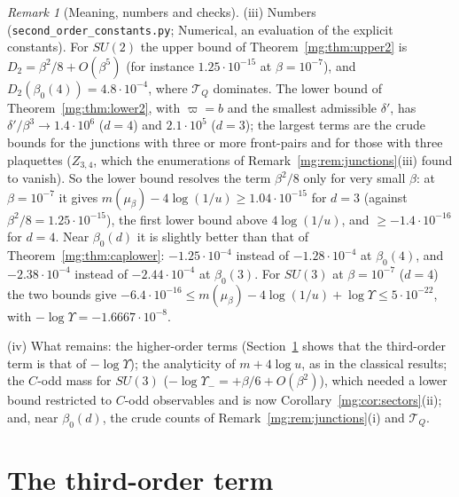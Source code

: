 \documentclass[11pt,a4paper]{article}
\theoremstyle{definition}
\theoremstyle{remark}
\newtheorem{remark}[theorem]{Remark}
\begin{document}
\begin{remark}[Meaning, numbers and checks]
(iii) Numbers (\texttt{second\_order\_constants.py}; Numerical, an evaluation of the explicit constants). For $SU(2)$ the upper bound of
Theorem~\ref{mg:thm:upper2} is $D_2=\beta^2/8+O(\beta^5)$ (for instance $1.25\cdot10^{-15}$ at $\beta=10^{-7}$), and $D_2(\beta_0(4))=4.8\cdot10^{-4}$, where
$\mathcal T_Q$ dominates. The lower bound of Theorem~\ref{mg:thm:lower2}, with $\varpi=b$ and the smallest admissible $\delta'$, has $\delta'/\beta^3\to1.4\cdot10^6$ ($d=4$)
and $2.1\cdot10^5$ ($d=3$); the largest terms are the crude bounds for the junctions with three or more front-pairs and for those with three plaquettes
($Z_{3,4}$, which the enumerations of Remark~\ref{mg:rem:junctions}(iii) found to vanish). So the lower bound resolves the term $\beta^2/8$ only for very small
$\beta$: at $\beta=10^{-7}$ it gives $m(\mu_\beta)-4\log(1/u)\ge1.04\cdot10^{-15}$ for $d=3$ (against $\beta^2/8=1.25\cdot10^{-15}$), the first lower bound
above $4\log(1/u)$, and $\ge-1.4\cdot10^{-16}$ for $d=4$. Near $\beta_0(d)$ it is slightly better than that of Theorem~\ref{mg:thm:caplower}:
$-1.25\cdot10^{-4}$ instead of $-1.28\cdot10^{-4}$ at $\beta_0(4)$, and $-2.38\cdot10^{-4}$ instead of $-2.44\cdot10^{-4}$ at $\beta_0(3)$. For $SU(3)$ at $\beta=10^{-7}$
($d=4$) the two bounds give $-6.4\cdot10^{-16}\le m(\mu_\beta)-4\log(1/u)+\log\Upsilon\le5\cdot10^{-22}$, with $-\log\Upsilon=-1.6667\cdot10^{-8}$.

(iv) What remains: the higher-order terms (Section~\ref{mg:sec:third} shows that the third-order term is that of $-\log\Upsilon$); the
analyticity of $m+4\log u$, as in the classical results; the $C$-odd mass for $SU(3)$ ($-\log\Upsilon_-=+\beta/6+O(\beta^2)$), which needed a
lower bound restricted to $C$-odd observables and is now Corollary~\ref{mg:cor:sectors}(ii); and, near $\beta_0(d)$, the crude counts of Remark~\ref{mg:rem:junctions}(i) and $\mathcal T_Q$.
\end{remark}

\section{The third-order term}\label{mg:sec:third}
\end{document}
